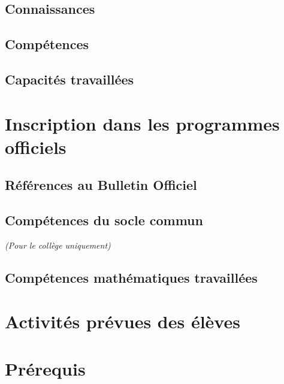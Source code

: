 \documentclass[11pt,a4paper]{article}
\begin{document}
\subsection{Connaissances}

\subsection{Compétences}

\subsection{Capacités travaillées}

\section{Inscription dans les programmes officiels}

\subsection{Références au Bulletin Officiel}

\subsection{Compétences du socle commun}
\textit{(Pour le collège uniquement)}


\subsection{Compétences mathématiques travaillées}

\section{Activités prévues des élèves}


\section{Prérequis}
\end{document}
